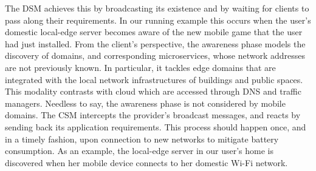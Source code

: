 The DSM achieves this by broadcasting its existence and by waiting for clients to pass along their requirements. In our running example this occurs when the user's domestic local-edge server becomes aware of the new mobile game that the user had just installed. 
From the client's perspective, the awareness phase models the discovery of domains, and corresponding microservices, whose network addresses are not previously known. In particular, it tackles edge domains that are integrated with the local network infrastructures of buildings and public spaces. This modality contrasts with cloud which are accessed through DNS and traffic managers. Needless to say, the awareness phase is not considered by mobile domains. The CSM intercepts the provider's broadcast messages, and reacts by sending back its application requirements. This process should happen once, and in a timely fashion, upon connection to new networks to mitigate battery consumption. As an example, the local-edge server in our user's home is discovered when her mobile device connects to her domestic Wi-Fi network. 






